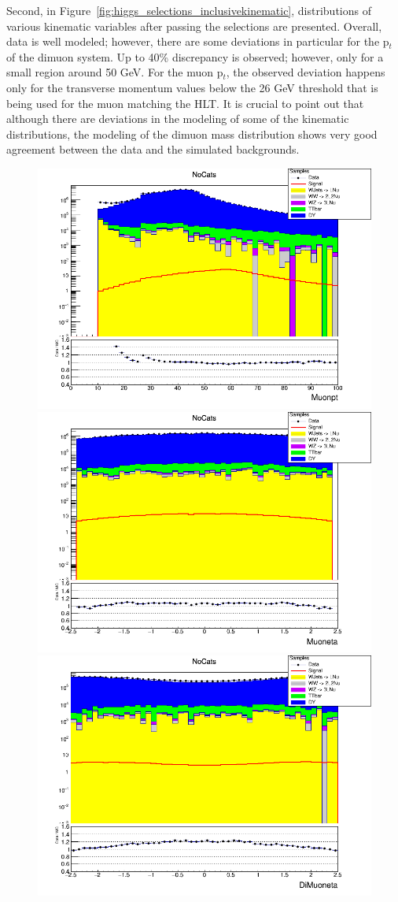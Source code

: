  Second, in Figure~\ref{fig:higgs_selections_inclusivekinematic}, distributions of various kinematic variables after passing the selections are presented. Overall, data is well modeled; however, there are some deviations in particular for the p$_t$ of the dimuon system. Up to 40\% discrepancy is observed; however, only for a small region around 50 GeV. For the muon p$_t$, the observed deviation happens only for the transverse momentum values below the 26 GeV threshold that is being used for the muon matching the HLT. It is crucial to point out that although there are deviations in the modeling of some of the kinematic distributions, the modeling of the dimuon mass distribution shows very good agreement between the data and the simulated backgrounds.
  \begin{figure}[htbp]
    \centering
    \includegraphics[width=0.45\linewidth]{figures/ch_higgs/distributions/baseline_kalman/distribution__NoCats__Muonpt__logY.png}
    \includegraphics[width=0.45\linewidth]{figures/ch_higgs/distributions/baseline_kalman/distribution__NoCats__Muoneta__logY.png}\\
    \includegraphics[width=0.45\linewidth]{figures/ch_higgs/distributions/baseline_kalman/distribution__NoCats__DiMuoneta__logY.png}

\end{figure}
